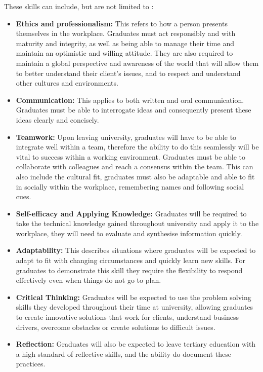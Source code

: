 \documentclass{l4proj}
\begin{document}
These skills can include, but are not limited to \citep{litchfield_contextualising_2010, stevens_industry_2016, bruno_reflective_2018}:

\begin{itemize}
    \item \textbf{Ethics and professionalism:} This refers to how a person presents themselves in the workplace. Graduates must act 
    responsibly and with maturity and integrity, as well as being able to manage their time and maintain an optimistic and willing 
    attitude. They are also required to maintain a global perspective and awareness of the world that will allow them to better 
    understand their client's issues, and to respect and understand other cultures and environments.
    \item \textbf{Communication:} This applies to both written and oral communication. Graduates must be able to 
    interrogate ideas and consequently present these ideas clearly and concisely.
    \item \textbf{Teamwork:} Upon leaving university, graduates will have to be able to integrate well within a team, therefore the ability to do 
    this seamlessly will be vital to success within a working environment. Graduates must be able to collaborate with colleagues and reach
    a consensus within the team. This can also include the cultural fit, graduates must also be adaptable and able to fit in socially
    within the workplace, remembering names and following social cues.
    \item \textbf{Self-efficacy and Applying Knowledge:} Graduates will be required to take the technical knowledge gained 
    throughout university and apply it to the workplace, they will need to evaluate and synthesise information quickly.
    \item \textbf{Adaptability:} This describes situations where graduates will be expected to adapt to fit with changing circumstances and 
    quickly learn new skills. For graduates to demonstrate this skill they require the flexibility to respond effectively even when 
    things do not go to plan. 
    \item \textbf{Critical Thinking:} Graduates will be expected to use the problem solving skills they developed throughout their time at 
    university, allowing graduates to create innovative solutions that work for clients, understand business drivers,
    overcome obstacles or create solutions to difficult issues.
    \item \textbf{Reflection:} Graduates will also be expected to leave tertiary education with a high standard of reflective skills, and the ability
    do document these practices. 
\end{itemize}
\end{document}

